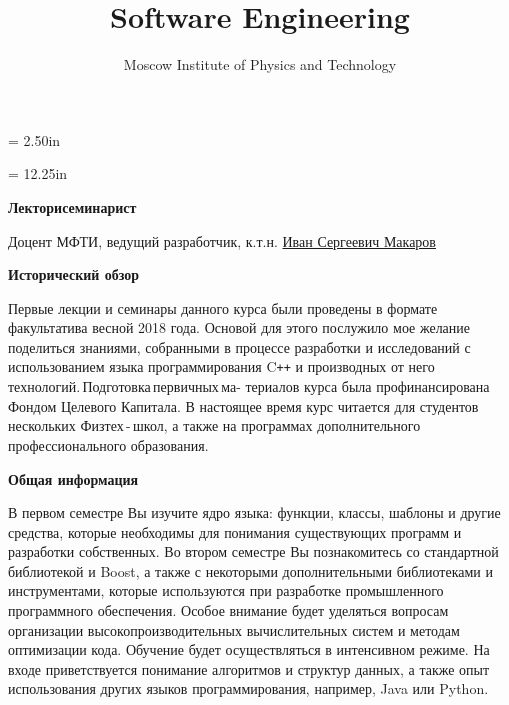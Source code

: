 \documentclass[a4paper,12pt]{article}
\begin{document}
\newpage\thispagestyle{empty}\pdfpageheight = 2.50in\enlargethispage{100in}

\title{\bf Software Engineering} 

\author{Moscow Institute of Physics and Technology}

\date{}

\maketitle



\newpage\thispagestyle{empty}\pdfpageheight = 12.25in\enlargethispage{100in}

\textbf{Лектор\:и\:семинарист}

\medskip

Доцент МФТИ, ведущий разработчик, к.т.н. \href{https://t.me/i_s_m_mipt}{Иван Сергеевич Макаров}

\medskip
\medskip

\textbf{Исторический обзор}

\medskip

Первые лекции и семинары данного курса были проведены в формате факультатива весной 2018 года. Основой для этого послужило мое желание поделиться знаниями, собранными в процессе разработки и исследований с использованием языка программирования C\texttt{++} и производных от него технологий.\,Подготовка\,первичных\,ма- териалов курса была профинансирована Фондом Целевого Капитала. В настоящее время курс читается для студентов нескольких Физтех\,-\,школ, а также на программах дополнительного профессионального образования.

\medskip
\medskip

\textbf{Общая информация}

\medskip

В первом семестре Вы изучите ядро языка: функции, классы, шаблоны и другие средства, которые необходимы для понимания существующих программ и разработки собственных. Во втором семестре Вы познакомитесь со стандартной библиотекой и Boost, а также с некоторыми дополнительными библиотеками и инструментами, которые используются при разработке промышленного программного обеспечения. Особое внимание будет уделяться вопросам организации высокопроизводительных вычислительных систем и методам оптимизации кода. Обучение будет осуществляться в интенсивном режиме. На входе приветствуется понимание алгоритмов и структур данных, а также опыт использования других языков программирования, например, Java или Python.
\end{document}
